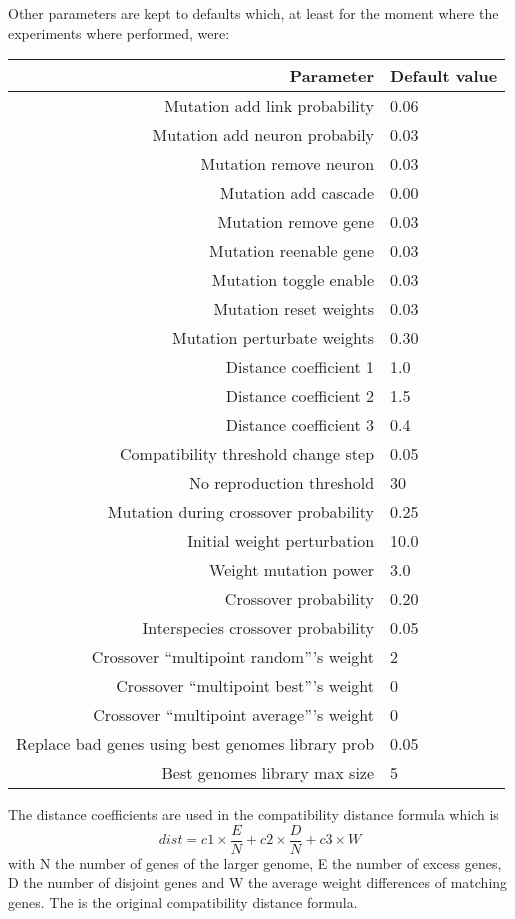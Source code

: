 Other parameters are kept to defaults which, at least for the moment where the experiments where performed, were:

\begin{tabular}{rl}
    \toprule
    Parameter & Default value \\
    \midrule
    Mutation add link probability & 0.06 \\
    Mutation add neuron probabily & 0.03 \\
    Mutation remove neuron & 0.03 \\
    Mutation add cascade & 0.00 \\
    Mutation remove gene & 0.03 \\
    Mutation reenable gene & 0.03 \\
    Mutation toggle enable & 0.03 \\
    Mutation reset weights & 0.03 \\
    Mutation perturbate weights & 0.30 \\[1ex]

    Distance coefficient 1 & 1.0 \\
    Distance coefficient 2 & 1.5 \\
    Distance coefficient 3 & 0.4 \\
    Compatibility threshold change step & 0.05 \\[1ex]

    No reproduction threshold & 30 \\
    Mutation during crossover probability & 0.25 \\
    Initial weight perturbation & 10.0 \\
    Weight mutation power & 3.0 \\[1ex]

    Crossover probability & 0.20 \\
    Interspecies crossover probability & 0.05 \\
    Crossover ``multipoint random'''s weight & 2 \\
    Crossover ``multipoint best'''s weight & 0 \\
    Crossover ``multipoint average'''s weight & 0 \\[1ex]

    Replace bad genes using best genomes library prob & 0.05 \\
    Best genomes library max size & 5 \\
    \bottomrule
\end{tabular}

The distance coefficients are used in the compatibility distance formula which is
\[dist = c1 × \frac{E}{N} + c2 × \frac{D}{N} + c3 × W\]
with N the number of genes of the larger genome, E the number of excess genes, D the number of disjoint genes and
W the average weight differences of matching genes.
The is the original compatibility distance formula.~\cite{StMi02}

